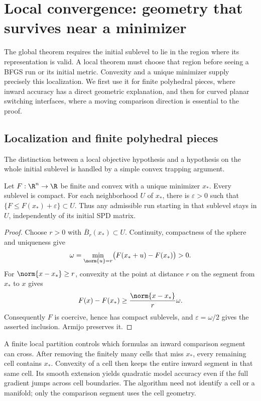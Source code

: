 \section{Local convergence: geometry that survives near a minimizer}\label{art:local}\label{art:positive}

The global theorem requires the initial sublevel to lie in the region where
its representation is valid. A local theorem must choose that region before
seeing a BFGS run or its initial metric. Convexity and a unique minimizer
supply precisely this localization. We first use it for finite polyhedral
pieces, where inward accuracy has a direct geometric explanation, and then
for curved planar switching interfaces, where a moving comparison direction
is essential to the proof.

\subsection{Localization and finite polyhedral pieces}

The distinction between a local objective hypothesis and a hypothesis on the
whole initial sublevel is handled by a simple convex trapping argument.

\begin{lemma}\label{art:localization}
Let $F:\R^n\to\R$ be finite and convex with a unique minimizer $x_*$.
Every sublevel is compact. For each neighborhood $U$ of $x_*$, there is
$\varepsilon>0$ such that $\{F\le F(x_*)+\varepsilon\}\subset U$.
Thus any admissible run starting in that sublevel stays in $U$, independently
of its initial SPD matrix.
\end{lemma}
\begin{proof}
Choose $r>0$ with $\overline B_r(x_*)\subset U$.
Continuity, compactness of the sphere and uniqueness give
\[
 \omega=\min_{\norm{u}=r}\bigl(F(x_*+u)-F(x_*)\bigr)>0.
\]
For $\norm{x-x_*}\ge r$, convexity at the point at distance $r$ on the
segment from $x_*$ to $x$ gives
\[
 F(x)-F(x_*)\ge\frac{\norm{x-x_*}}r\omega.
\]
Consequently $F$ is coercive, hence has compact sublevels, and
$\varepsilon=\omega/2$ gives the asserted inclusion. Armijo preserves it.
\end{proof}

A finite local partition controls which formulas an inward comparison segment
can cross. After removing the finitely many cells that miss $x_*$, every
remaining cell contains $x_*$. Convexity of a cell then keeps the entire
inward segment in that same cell. Its smooth extension yields quadratic
model accuracy even if the full gradient jumps across cell boundaries.
The algorithm need not identify a cell or a manifold; only the comparison
segment uses the cell geometry.

